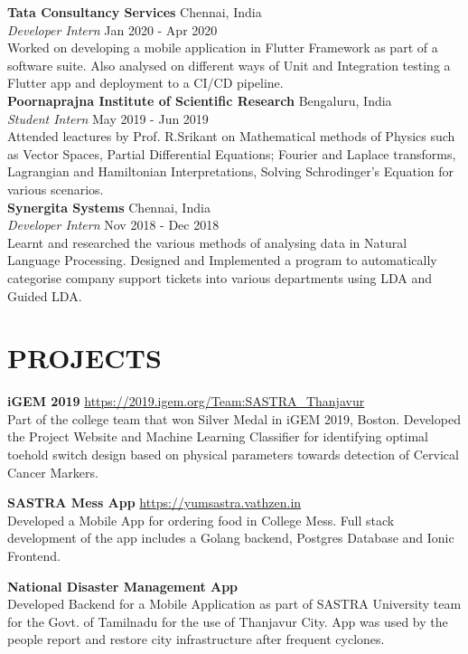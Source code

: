 \documentclass[a4paper,9pt]{extarticle}
\begin{document}
\noindent
\textbf{Tata Consultancy Services} \hfill Chennai, India\\
\textit{Developer Intern} \hfill Jan 2020 - Apr 2020\\
Worked on developing a mobile application in Flutter Framework as part of a software suite. Also analysed on different ways of
Unit and Integration testing a Flutter app and deployment to a CI/CD pipeline.\\

\noindent
\textbf{Poornaprajna Institute of Scientific Research} \hfill Bengaluru, India\\
\textit{Student Intern} \hfill May 2019 - Jun 2019\\
Attended leactures by Prof. R.Srikant on Mathematical methods of Physics such as Vector Spaces, Partial Differential Equations; Fourier and Laplace transforms, Lagrangian and Hamiltonian Interpretations, Solving Schrodinger’s
Equation for various scenarios.\\

\noindent
\textbf{Synergita Systems} \hfill Chennai, India\\
\textit{Developer Intern} \hfill Nov 2018 - Dec 2018\\
Learnt and researched the various methods of analysing data in Natural Language Processing. Designed and Implemented a
program to automatically categorise company support tickets into various departments using LDA and Guided LDA.

\section*{PROJECTS}
\noindent
\textbf{iGEM 2019} \hfill \url{https://2019.igem.org/Team:SASTRA_Thanjavur}\\
Part of the college team that won Silver Medal in iGEM 2019, Boston. Developed the Project Website and Machine Learning
Classifier for identifying optimal toehold switch design based on physical parameters towards detection of Cervical Cancer
Markers.

\noindent
\textbf{SASTRA Mess App} \hfill \url{https://yumsastra.vathzen.in}\\
Developed a Mobile App for ordering food in College Mess. Full stack development of the app includes a Golang backend,
Postgres Database and Ionic Frontend.

\noindent
\textbf{National Disaster Management App}\\
Developed Backend for a Mobile Application as part of SASTRA University team for the Govt. of Tamilnadu for the use of
Thanjavur City. App was used by the people report and restore city infrastructure after frequent cyclones.\\
\end{document}
